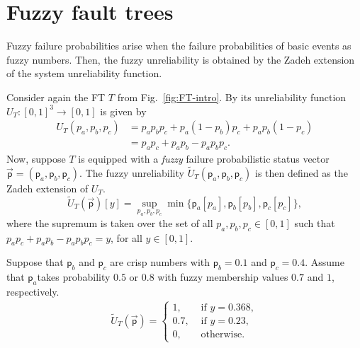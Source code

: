 \documentclass[runningheads]{llncs}
\newcommand{\colorpar}[3]{\colorbox{#1}{\parbox{#2}{#3}}}
\newcommand{\marginremark}[3]{\marginpar{\colorpar{#2}{7em}{\color{#1}#3}}}
\newcommand{\ms}[1]{}
\newcommand{\ms}[1]{\marginremark{purple}{white}{\tiny{[MS]~ #1}}}
\renewcommand{\emph}[1]{{\it #1}}
\begin{document}
\section{Fuzzy fault trees}\label{sec:fuzzy_unreliability}

Fuzzy failure probabilities arise when the failure probabilities of basic events as fuzzy numbers. Then, the fuzzy unreliability is obtained by the Zadeh extension of the system unreliability function.

\begin{example}\label{ex:fuzzy_unreliability}
Consider again the FT $T$ from Fig.~\ref{fig:FT-intro}. By  its unreliability function $U_T\colon [0,1]^3 \rightarrow [0,1]$ is given by
\begin{align*}
    U_T(p_a, p_b, p_c) &= p_ap_bp_c+  p_a(1-p_b)p_c +  p_ap_b(1-p_c)\\
    &= p_ap_c+p_ap_b-p_ap_bp_c.
\end{align*}
Now, suppose $T$ is equipped with a \emph{fuzzy} failure probabilistic status vector $\vec{\mathsf{p}}=(\mathsf{p}_a, \mathsf{p}_b, \mathsf{p}_c)$. 
The fuzzy unreliability $\widetilde{U}_T(\mathsf{p}_a, \mathsf{p}_b, \mathsf{p}_c)$ is then defined as the Zadeh extension of $U_T$. 
\[
\widetilde{U}_T(\vec{\mathsf{p}})[y] = \sup_{p_a,p_b, p_c}  \min \{ \mathsf{p}_a[p_a], \mathsf{p}_b[p_b], \mathsf{p}_c[p_c] \} ,
\]
where the supremum is taken over the set of all $p_a,p_b, p_c \in [0,1]$ such that $p_ap_c+p_ap_b-p_ap_bp_c  = y$,  for all $y\in [0,1]$.


Suppose that $\mathsf{p}_b$ and $\mathsf{p}_c$ are crisp numbers with $\mathsf{p}_b=0.1$ and $\mathsf{p}_c=0.4$. Assume that $\mathsf{p}_a$takes probability $0.5$ or $0.8$ with fuzzy membership values $0.7$ and $1$, respectively. 
%
\begin{align*}                 
\widetilde{U}_T(\vec{\mathsf{p}}) =\begin{cases}
                        1, & \textrm{ if $y=0.368$},\\
                        0.7, & \textrm{ if $y=0.23$},\\
                        0, & \textrm{ otherwise}.
                    \end{cases}
    \end{align*}
\end{example}
\end{document}
